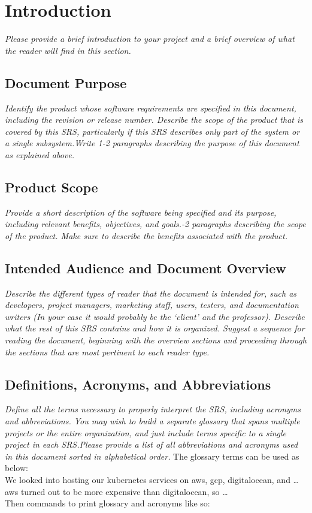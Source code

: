 
\section{Introduction}
    \emph{Please provide a brief introduction to your project and a brief overview of what the reader will find in this section.}
    \subsection{Document Purpose}
        \emph{Identify the product whose software requirements are specified in this document, including the revision or release number. Describe the scope of the product that is covered by this SRS, particularly if this SRS describes only part of the system or a single subsystem.\gnl Write 1-2 paragraphs describing the purpose of this document as explained above.}
    \subsection{Product Scope}
        \emph{Provide a short description of the software being specified and its purpose, including relevant benefits, objectives, and goals.-2 paragraphs describing the scope of the product. Make sure to describe the benefits associated with the product.}
    \subsection{Intended Audience and Document Overview}
        \emph{Describe the different types of reader that the document is intended for, such as developers, project managers, marketing staff, users, testers, and documentation writers (In your case it would probably be the `client' and the professor). Describe what the rest of this SRS contains and how it is organized. Suggest a sequence for reading the document, beginning with the overview sections and proceeding through the sections that are most pertinent to each reader type.}
    \subsection{Definitions, Acronyms, and Abbreviations}
        \emph{Define all the terms necessary to properly interpret the SRS, including acronyms and abbreviations. You may wish to build a separate glossary that spans multiple projects or the entire organization, and just include terms specific to a single project in each SRS.\gnl Please provide a list of all abbreviations and acronyms used in this document sorted in alphabetical order.}
        \gnl The glossary terms can be used as below:
        \\\hspace*{10mm} We looked into hosting our \gls{kubernetes} services on \gls{aws}, \gls{gcp}, \gls{digitalocean}, and \dots \Gls{aws} turned out to be more expensive than \gls{digitalocean}, so \dots
        \\ Then commands to print glossary and acronyms like so: 
        \printnoidxglossary
        \printnoidxglossary[type=acronym]
        \printacronyms

